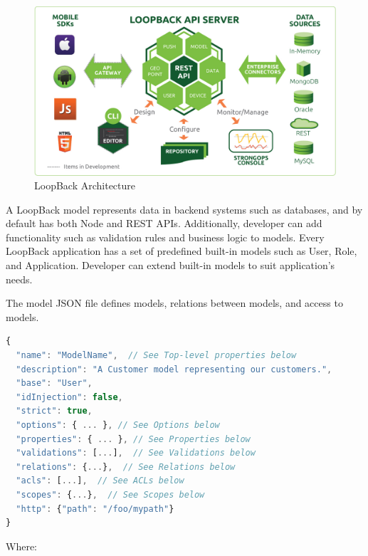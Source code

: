 \begin {figure}[h]
\graphicspath{{images/chapter_TCH/}}
\includegraphics[width=\textwidth]{loopback_1}
\caption{LoopBack Architecture}
\end {figure}



A LoopBack model represents data in backend systems such as databases, and by default has both Node and REST APIs.  Additionally, developer can add functionality such as validation rules and business logic to models.
Every LoopBack application has a set of predefined built-in models such as User, Role, and Application.  Developer can extend built-in models to suit application's needs.

The model JSON file defines models, relations between models, and access to models. 

\begin{lstlisting}[language=javascript]
{
  "name": "ModelName",  // See Top-level properties below
  "description": "A Customer model representing our customers.",
  "base": "User",
  "idInjection": false,
  "strict": true,
  "options": { ... }, // See Options below
  "properties": { ... }, // See Properties below
  "validations": [...],  // See Validations below
  "relations": {...},  // See Relations below
  "acls": [...],  // See ACLs below
  "scopes": {...},  // See Scopes below
  "http": {"path": "/foo/mypath"}
}
\end{lstlisting}

Where:

